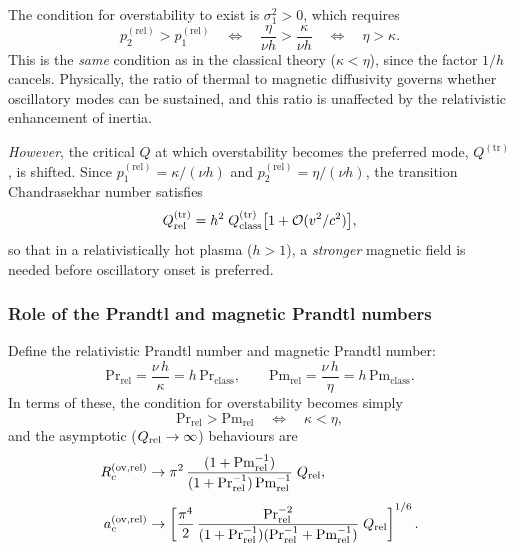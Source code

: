 The condition for overstability to exist is $\sigma_{1}^{2} > 0$, which
requires
\begin{equation}
  p_{2}^{(\mathrm{rel})} > p_{1}^{(\mathrm{rel})}
  \quad\Longleftrightarrow\quad
  \frac{\eta}{\nu h} > \frac{\kappa}{\nu h}
  \quad\Longleftrightarrow\quad
  \eta > \kappa .
  \label{eq:rel-overstab-condition}
\end{equation}
This is the \emph{same} condition as in the classical theory ($\kappa <
\eta$), since the factor $1/h$ cancels.  Physically, the ratio of thermal
to magnetic diffusivity governs whether oscillatory modes can be sustained,
and this ratio is unaffected by the relativistic enhancement of inertia.

\emph{However}, the critical $Q$ at which overstability becomes the
preferred mode, $Q^{(\mathrm{tr})}$, is shifted.  Since
$p_{1}^{(\mathrm{rel})} = \kappa/(\nu h)$ and $p_{2}^{(\mathrm{rel})} = \eta/(\nu h)$, the
transition Chandrasekhar number satisfies
\begin{equation}
  Q_{\mathrm{rel}}^{(\mathrm{tr})}
  = h^{2}\;Q_{\mathrm{class}}^{(\mathrm{tr})}
    \bigl[1 + \mathcal{O}(v^{2}/c^{2})\bigr] ,
  \label{eq:rel-Qtr}
\end{equation}
so that in a relativistically hot plasma ($h>1$), a \emph{stronger}
magnetic field is needed before oscillatory onset is preferred.

\subsubsection{Role of the Prandtl and magnetic Prandtl numbers}

Define the relativistic Prandtl number and magnetic Prandtl number:
\begin{equation}
  \mathrm{Pr}_{\mathrm{rel}} = \frac{\nu\,h}{\kappa}
  = h\,\mathrm{Pr}_{\mathrm{class}} ,\qquad
  \mathrm{Pm}_{\mathrm{rel}} = \frac{\nu\,h}{\eta}
  = h\,\mathrm{Pm}_{\mathrm{class}} .
  \label{eq:rel-Pr-Pm}
\end{equation}
In terms of these, the condition for overstability becomes simply
\begin{equation}
  \mathrm{Pr}_{\mathrm{rel}} > \mathrm{Pm}_{\mathrm{rel}}
  \quad\Longleftrightarrow\quad
  \kappa < \eta ,
  \label{eq:rel-overstab-Pr-Pm}
\end{equation}
and the asymptotic ($Q_{\mathrm{rel}}\to\infty$) behaviours are
\begin{align}
  R_{c}^{(\mathrm{ov,rel})}
  &\to \pi^{2}\,
       \frac{(1+\mathrm{Pm}_{\mathrm{rel}}^{-1})}
            {(1+\mathrm{Pr}_{\mathrm{rel}}^{-1})\,
             \mathrm{Pm}_{\mathrm{rel}}^{-1}}\;Q_{\mathrm{rel}} ,
  \label{eq:rel-Rc-ov-asymp}\\[4pt]
  a_{c}^{(\mathrm{ov,rel})}
  &\to \left[\frac{\pi^{4}}{2}\,
       \frac{\mathrm{Pr}_{\mathrm{rel}}^{-2}}
            {(1+\mathrm{Pr}_{\mathrm{rel}}^{-1})
             (\mathrm{Pr}_{\mathrm{rel}}^{-1}+\mathrm{Pm}_{\mathrm{rel}}^{-1})}
       \;Q_{\mathrm{rel}}\right]^{1/6} .
  \label{eq:rel-ac-ov-asymp}
\end{align}

